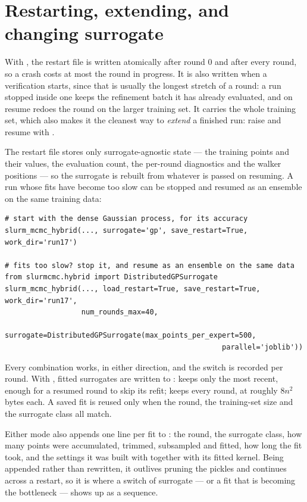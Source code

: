 \section{Restarting, extending, and changing surrogate}

With , the restart file is written atomically after round 0 and after every
round, so a crash costs at most the round in progress. It is also written when a verification starts,
since that is usually the longest stretch of a round: a run stopped inside one keeps the refinement
batch it has already evaluated, and on resume redoes the round on the larger training set. It carries the whole training set, which also
makes it the cleanest way to \emph{extend} a finished run: raise  and resume
with .

The restart file stores only surrogate-agnostic state --- the training points and their values, the
evaluation count, the per-round diagnostics and the walker positions --- so the surrogate is rebuilt
from whatever is passed on resuming. A run whose fits have become too slow can be stopped and resumed
as an ensemble on the same training data:
\begin{lstlisting}
# start with the dense Gaussian process, for its accuracy
slurm_mcmc_hybrid(..., surrogate='gp', save_restart=True, work_dir='run17')

# fits too slow? stop it, and resume as an ensemble on the same data
from slurmcmc.hybrid import DistributedGPSurrogate
slurm_mcmc_hybrid(..., load_restart=True, save_restart=True, work_dir='run17',
                  num_rounds_max=40,
                  surrogate=DistributedGPSurrogate(max_points_per_expert=500,
                                                   parallel='joblib'))
\end{lstlisting}
Every combination works, in either direction, and the switch is recorded per round. With
, fitted surrogates are written to :
 keeps only the most recent, enough for a resumed round to skip its refit;
 keeps every round, at roughly $8n^2$ bytes each. A saved fit is reused only when the
round, the training-set size and the surrogate class all match.

Either mode also appends one line per fit to : the
round, the surrogate class, how many points were accumulated, trimmed, subsampled and fitted, how
long the fit took, and the settings it was built with together with its fitted kernel. Being
appended rather than rewritten, it outlives  pruning the pickles and continues
across a restart, so it is where a switch of surrogate --- or a fit that is becoming the bottleneck
--- shows up as a sequence.

